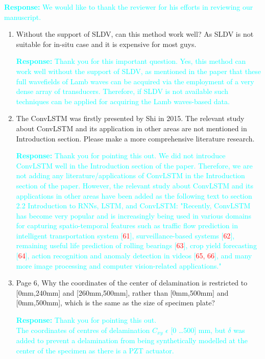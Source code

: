 \documentclass[11pt,a2paper]{report}
\begin{document}
\textcolor{Cyan}{
	\newline\textbf{Response:}
	We would like to thank the reviewer for his efforts in reviewing our 
	manuscript.
}
\begin{enumerate}
	\item Without the support of SLDV, can this method work well? As SLDV is 
	not suitable for in-situ case and it is expensive for most guys.
	
	\textcolor{Cyan}{
		\textbf{Response:}
		Thank you for this important question.
		Yes, this method can work well without the support of SLDV, as 
		mentioned in the paper that these full wavefields of Lamb waves can be 
		acquired via the employment of a very dense array of transducers.
		Therefore, if SLDV is not available such techniques can be applied for 
		acquiring the Lamb waves-based data.  
	}
	
	\item The ConvLSTM was firstly presented by Shi in 2015.
	The relevant study about ConvLSTM and its application in other areas are 
	not mentioned in Introduction section.
	Please make a more comprehensive literature research.
	
	\textcolor{Cyan}{
		\textbf{Response:}
		Thank you for pointing this out.
		We did not introduce ConvLSTM well in the Introduction section of the 
		paper. 
		Therefore, we are not adding any literature/applications of ConvLSTM in 
		the Introduction section of the paper.
		However, the relevant study about ConvLSTM and its applications in 
		other areas have been added as the following text to section 2.2 
		Introduction to RNNs, LSTM, and ConvLSTM:
		\newline"Recently, ConvLSTM has become very popular and is increasingly 
		being used in various domains for capturing spatio-temporal features 
		such as traffic flow prediction in intelligent transportation 
		system [\textcolor{red}{61}], surveillance-based 
		systems [\textcolor{red}{62}], remaining useful life prediction of 
		rolling bearings [\textcolor{red}{63}], crop yield 
		forecasting [\textcolor{red}{64}], action recognition and anomaly 
		detection in videos [\textcolor{red}{65, 66}], and many more image 
		processing and computer vision-related applications."
	}
	\item Page 6, Why the coordinates of the center of delamination is 
	restricted to [0mm,240mm] and [260mm,500mm], rather than [0mm,500mm] and 
	[0mm,500mm], which is the same as the size of specimen plate?
	
	\textcolor{Cyan}{
		\textbf{Response:}
		Thank you for pointing this out.\\
		The coordinates of centres of delamination \(C_{xy}\) $\epsilon$ [0 \dots 500] mm, but $\delta$ was added to prevent a delamination from being synthetically modelled at the center of the specimen as there is a PZT actuator.
	}
	

\end{enumerate}
\end{document}
